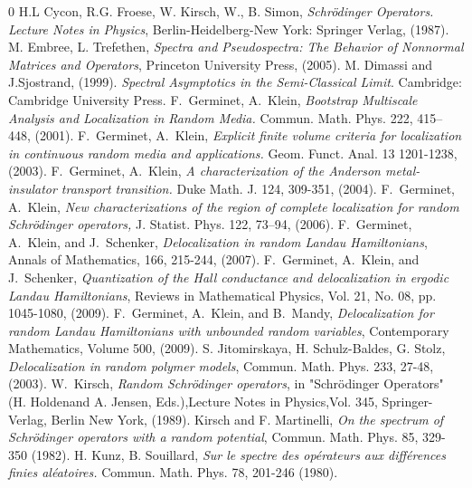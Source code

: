 \documentclass[reqno,12pt,letterpaper]{amsart}
\numberwithin{equation}{section}
\begin{document}
\begin{thebibliography}{0}
 H.L Cycon, R.G. Froese, W. Kirsch, W., B. Simon, \emph{Schr\"odinger Operators. Lecture Notes
in Physics}, Berlin-Heidelberg-New York: Springer Verlag, (1987).
 M. Embree, L. Trefethen, \emph{Spectra and Pseudospectra: The Behavior of Nonnormal Matrices and Operators}, Princeton University Press, (2005).
 M. Dimassi and J.Sjostrand, (1999). \emph{Spectral Asymptotics in the Semi-Classical Limit}. Cambridge: Cambridge University Press.
 F.~Germinet, A.~Klein, \emph{Bootstrap Multiscale Analysis and Localization in Random Media.} Commun. Math. Phys. 222, 415–448, (2001).
F.~Germinet, A.~Klein, \emph{Explicit finite volume criteria for localization in continuous
random media and applications.} Geom. Funct. Anal. 13 1201-1238, (2003).
 F.~Germinet, A.~Klein, \emph{A characterization of the Anderson metal-insulator transport
transition.} Duke Math. J. 124, 309-351, (2004).
 F.~Germinet, A.~Klein, \emph{New characterizations of the region of complete localization for random Schr\"odinger operators,} J. Statist. Phys. 122, 73–94, (2006).
 F.~Germinet, A.~Klein, and J.~Schenker, {\emph{Delocalization in random Landau Hamiltonians}}, Annals of Mathematics, 166, 215-244, (2007). 
 F.~Germinet, A.~Klein, and J.~Schenker, {\emph{Quantization of the Hall conductance and delocalization in ergodic Landau Hamiltonians}}, Reviews in Mathematical Physics, Vol. 21, No. 08, pp. 1045-1080, (2009).
F.~Germinet, A.~Klein, and B.~Mandy, {\emph{Delocalization for random Landau Hamiltonians with unbounded random variables}}, Contemporary Mathematics, Volume 500, (2009).
 S. Jitomirskaya, H. Schulz-Baldes, G. Stolz, \emph{Delocalization in random polymer models}, Commun. Math. Phys. 233, 27-48, (2003).
 W.~Kirsch, \emph{Random Schr\"odinger operators}, in "Schr\"odinger Operators" (H. Holdenand A. Jensen, Eds.),Lecture Notes in Physics,Vol. 345, Springer-Verlag, Berlin New York, (1989).
 Kirsch and F. Martinelli, \emph{On the spectrum of Schrödinger operators with a random
potential}, Commun. Math. Phys. 85, 329-350 (1982).
 H. Kunz, B. Souillard, \emph{Sur le spectre des opérateurs aux différences finies aléatoires.}
Commun. Math. Phys. 78, 201-246 (1980).

\end{thebibliography}
\end{document}
